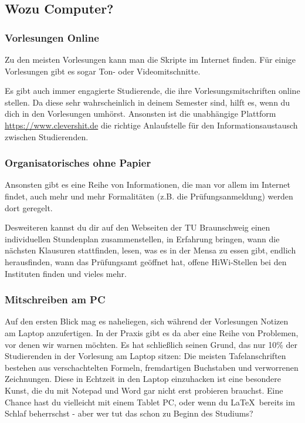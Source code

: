 	\subsection{Wozu Computer?}
		\subsubsection{Vorlesungen Online}
			Zu den meisten Vorlesungen kann man die Skripte im Internet finden. Für einige Vorlesungen gibt es sogar Ton- oder Videomitschnitte.

			Es gibt auch immer engagierte Studierende, die ihre Vorlesungsmitschriften online stellen. Da diese sehr wahrscheinlich in deinem Semester sind, hilft es, wenn du dich in den Vorlesungen umhörst. Ansonsten ist die unabhängige Plattform \url{https://www.clevershit.de} die richtige Anlaufstelle für den Informationsaustausch zwischen Studierenden.

		\subsubsection{Organisatorisches ohne Papier}
			Ansonsten gibt es eine Reihe von Informationen, die man vor allem im Internet findet, auch mehr und mehr Formalitäten (z.B. die Prüfungsanmeldung) werden dort geregelt.

			Desweiteren kannst du dir auf den Webseiten der TU Braunschweig einen individuellen Stundenplan zusammenstellen, in Erfahrung bringen, wann die nächsten Klausuren stattfinden, lesen, was es in der Mensa zu essen gibt, endlich herausfinden, wann das Prüfungsamt geöffnet hat,  offene HiWi-Stellen bei den Instituten finden und vieles mehr.

		\subsubsection{Mitschreiben am PC}
			Auf den ersten Blick mag es naheliegen, sich während der Vorlesungen Notizen am Laptop anzufertigen. In der Praxis gibt es da aber eine Reihe von Problemen, vor denen wir  warnen möchten. Es hat schließlich seinen Grund, das nur 10\% der Studierenden in der Vorlesung am Laptop sitzen: Die meisten Tafelanschriften bestehen  aus verschachtelten Formeln, fremdartigen Buchstaben und verworrenen Zeichnungen. Diese in Echtzeit in den Laptop einzuhacken ist eine besondere Kunst, die du mit Notepad und Word gar nicht erst probieren brauchst. Eine Chance hast du vielleicht mit einem Tablet PC, oder wenn du \LaTeX ~bereits im Schlaf beherrschst - aber wer tut das schon zu Beginn des Studiums?

